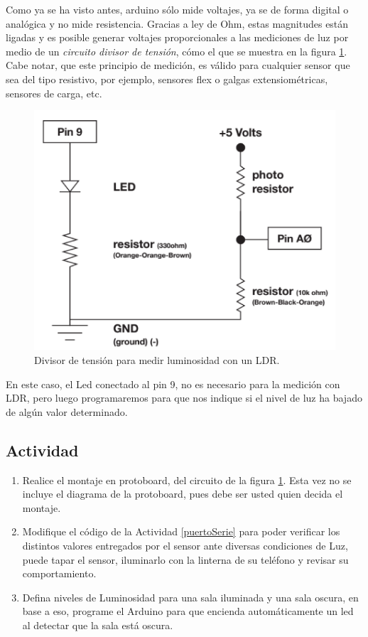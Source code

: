 \documentclass[letterpaper, 10pt]{report}
\begin{document}
Como ya se ha visto antes, arduino sólo mide voltajes, ya se de forma digital o analógica y no mide resistencia. Gracias a ley de Ohm, estas magnitudes están ligadas y es posible generar voltajes proporcionales a las mediciones de luz por medio de un \emph{circuito divisor de tensión}, cómo el que se muestra en la figura \ref{circuitoLDR}. Cabe notar, que este principio de medición, es válido para cualquier sensor que sea del tipo resistivo, por ejemplo, sensores flex o galgas extensiométricas, sensores de carga, etc.
\begin{figure}[h]
\centering
\includegraphics[scale=0.35]{circuitoLDR.png}
\caption{Divisor de tensión para medir luminosidad con un LDR.\label{circuitoLDR}}
\end{figure}

En este caso, el Led conectado al pin 9, no es necesario para la medición con LDR, pero luego programaremos para que nos indique si el nivel de luz ha bajado de algún valor determinado.

\subsection{Actividad}

\begin{enumerate}
\item Realice el montaje en protoboard, del circuito de la figura \ref{circuitoLDR}. Esta vez no se incluye el diagrama de la protoboard, pues debe ser usted quien decida el montaje.
\item Modifique el código de la Actividad \ref{puertoSerie} para poder verificar los distintos valores entregados por el sensor ante diversas condiciones de Luz, puede tapar el sensor, iluminarlo con la linterna de su teléfono y revisar su comportamiento.

\item Defina niveles de Luminosidad para una sala iluminada y una sala oscura, en base a eso, programe el Arduino para que encienda automáticamente un led al detectar que la sala está oscura.
\end{enumerate}
\end{document}
